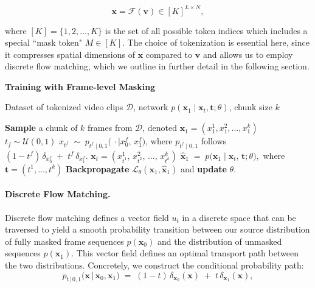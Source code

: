 \begin{equation}
    \mathbf{x} = \mathcal{F}(\mathbf{v}) \in [K]^{L \times N},
\end{equation}

where \([K] = \{1, 2, \ldots, K\}\) is the set of all possible token indices which includes a special ``mask token" $M \in [K]$. The choice of tokenization is essential here, since it compresses spatial dimensions of $\mathbf{x}$ compared to $\mathbf{v}$ and allows us to employ discrete flow matching, which we outline in further detail in the following section.

\begin{algorithm}[!ht]
\caption{\textbf{Training with Frame-level Masking}}
\label{alg:training}
\begin{algorithmic}[1]
\REQUIRE 
  Dataset of tokenized video clips $\mathcal{D}$, 
  network $p(\mathbf{x}_1 \mid \mathbf{x}_t, \mathbf{t};\theta)$, 
  chunk size $k$

    \STATE \textbf{Sample} a chunk of $k$ frames  from $\mathcal{D}$, denoted 
      $\mathbf{x}_1 = (x_1^1, x_1^2, \dots, x_1^k)$
        \STATE $t_f \sim \mathcal{U}(0,1)$
        \STATE 
           $x_{t^f} \;\sim\; p_{t^f \mid 0,1}\bigl(\,\cdot \mid x_0^f,\,x_1^f\bigr)$,
        where $p_{t^f \mid 0,1}$ follows 
        $
           (1 - t^f)\,\delta_{x_0^f} 
           \;+\; 
           t^f\,\delta_{x_1^f}.
        $
    \ENDFOR
    \STATE $\mathbf{x}_t = (x_{t^1}^1,\, x_{t^2}^2,\, \dots,\, x_{t^k}^k)$
    \STATE 
    $
       \hat{\mathbf{x}}_1 \;=\; p\bigl(\mathbf{x}_1 \mid \mathbf{x}_t,\, \mathbf{t};\theta\bigr),
    $
    where $\mathbf{t} = (t^1,\ldots,t^k)$
    \STATE \textbf{Backpropagate} $\mathcal{L}_\theta(\mathbf{x}_1, \hat{\mathbf{x}}_1)$ and \textbf{update} $\theta$.
\ENDWHILE
\end{algorithmic}
\end{algorithm}
\vspace{-10pt}

\paragraph{Discrete Flow Matching.}  
Discrete flow matching \cite{gat2024discrete} defines a vector field \(u_t\) in a discrete space that can be traversed to yield a smooth probability transition between our source distribution of fully masked frame sequences $p(\mathbf{x}_0)$ and the distribution of unmasked sequences $p(\mathbf{x}_1)$. This vector field defines an optimal transport path between the two distributions. Concretely, we construct the conditional probability path:
\begin{equation}
    p_{t \,\vert\, 0,1}\bigl(\mathbf{x} \,\vert\, \mathbf{x}_0, \mathbf{x}_1\bigr)
    \;=\; (1-t)\,\delta_{\mathbf{x}_0}(\mathbf{x})
    \;+\; t\,\delta_{\mathbf{x}_1}(\mathbf{x}),
\end{equation}

